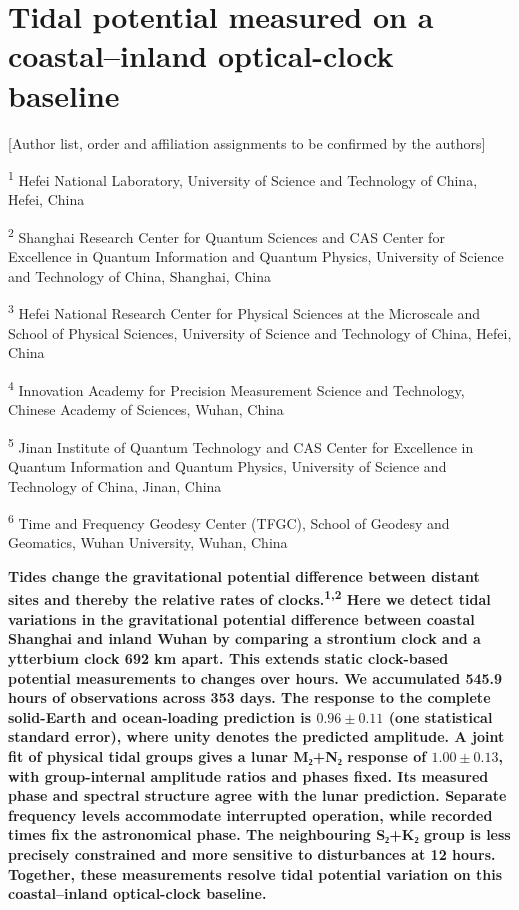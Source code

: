 \documentclass[
  12pt,
  a4paper,
]{article}
\author{}
\date{}
\begin{document}
\hypertarget{tidal-potential-measured-on-a-coastalinland-optical-clock-baseline}{%
\section{Tidal potential measured on a coastal--inland optical-clock
baseline}\label{tidal-potential-measured-on-a-coastalinland-optical-clock-baseline}}

\begingroup\singlespacing

{[}Author list, order and affiliation assignments to be confirmed by the
authors{]}

\textsuperscript{1} Hefei National Laboratory, University of Science and
Technology of China, Hefei, China

\textsuperscript{2} Shanghai Research Center for Quantum Sciences and
CAS Center for Excellence in Quantum Information and Quantum Physics,
University of Science and Technology of China, Shanghai, China

\textsuperscript{3} Hefei National Research Center for Physical Sciences
at the Microscale and School of Physical Sciences, University of Science
and Technology of China, Hefei, China

\textsuperscript{4} Innovation Academy for Precision Measurement Science
and Technology, Chinese Academy of Sciences, Wuhan, China

\textsuperscript{5} Jinan Institute of Quantum Technology and CAS Center
for Excellence in Quantum Information and Quantum Physics, University of
Science and Technology of China, Jinan, China

\textsuperscript{6} Time and Frequency Geodesy Center (TFGC), School of
Geodesy and Geomatics, Wuhan University, Wuhan, China

\endgroup

\textbf{Tides change the gravitational potential difference between
distant sites and thereby the relative rates of
clocks.\textsuperscript{1,2} Here we detect tidal variations in the
gravitational potential difference between coastal Shanghai and inland
Wuhan by comparing a strontium clock and a ytterbium clock 692 km apart.
This extends static clock-based potential measurements to changes over
hours. We accumulated 545.9 hours of observations across 353 days. The
response to the complete solid-Earth and ocean-loading prediction is
\(0.96\pm0.11\) (one statistical standard error), where unity denotes
the predicted amplitude. A joint fit of physical tidal groups gives a
lunar M₂+N₂ response of \(1.00\pm0.13\), with group-internal amplitude
ratios and phases fixed. Its measured phase and spectral structure agree
with the lunar prediction. Separate frequency levels accommodate
interrupted operation, while recorded times fix the astronomical phase.
The neighbouring S₂+K₂ group is less precisely constrained and more
sensitive to disturbances at 12 hours. Together, these measurements
resolve tidal potential variation on this coastal--inland optical-clock
baseline.}
\end{document}

